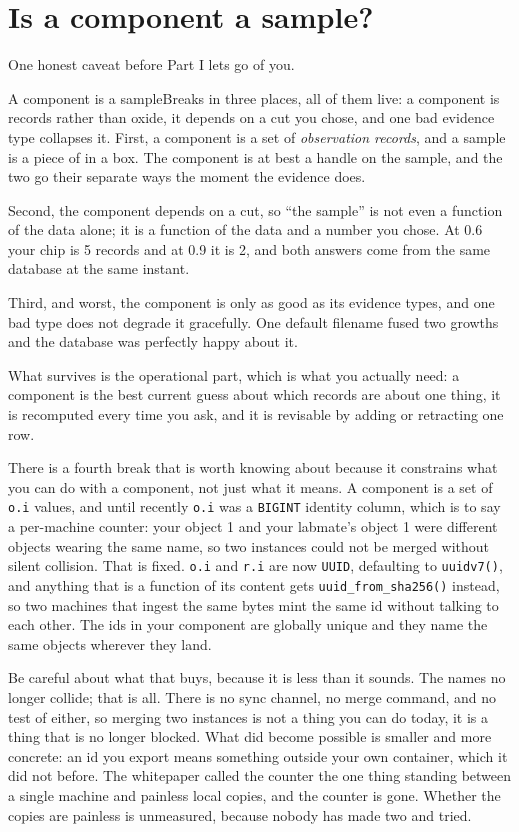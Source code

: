\section{Is a component a sample?}

One honest caveat before Part I lets go of you.

\begin{Analogy}{A component is a sample}{Breaks in three places, all of them live: a component is records rather than oxide, it depends on a cut you chose, and one bad evidence type collapses it.}
First, a component is a set of \emph{observation records}, and a sample is a piece of \labMaterialWord{} in a box. The component is at best a handle on the sample, and the two go their separate ways the moment the evidence does.

Second, the component depends on a cut, so ``the sample'' is not even a function of the data alone; it is a function of the data and a number you chose. At 0.6 your chip is 5 records and at 0.9 it is 2, and both answers come from the same database at the same instant.

Third, and worst, the component is only as good as its evidence types, and one bad type does not degrade it gracefully. One default filename fused two growths and the database was perfectly happy about it.

What survives is the operational part, which is what you actually need: a component is the best current guess about which records are about one thing, it is recomputed every time you ask, and it is revisable by adding or retracting one row.
\end{Analogy}

There is a fourth break that is worth knowing about because it constrains what you can do with a component, not just what it means. A component is a set of \texttt{o.i} values, and until recently \texttt{o.i} was a \texttt{BIGINT} identity column, which is to say a per-machine counter: your object 1 and your labmate's object 1 were different objects wearing the same name, so two instances could not be merged without silent collision. That is fixed. \texttt{o.i} and \texttt{r.i} are now \texttt{UUID}, defaulting to \texttt{uuidv7()}, and anything that is a function of its content gets \texttt{uuid\_from\_sha256()} instead, so two machines that ingest the same bytes mint the same id without talking to each other. The ids in your component are globally unique and they name the same objects wherever they land.

Be careful about what that buys, because it is less than it sounds. The names no longer collide; that is all. There is no sync channel, no merge command, and no test of either, so merging two instances is not a thing you can do today, it is a thing that is no longer blocked. What did become possible is smaller and more concrete: an id you export means something outside your own container, which it did not before. The whitepaper called the counter the one thing standing between a single machine and painless local copies, and the counter is gone. Whether the copies are painless is unmeasured, because nobody has made two and tried.

